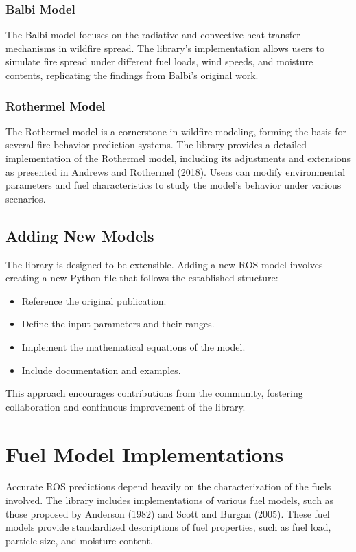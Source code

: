 \documentclass{article}
\begin{document}
	\subsubsection{Balbi Model}
	The Balbi model focuses on the radiative and convective heat transfer mechanisms in wildfire spread. The library's implementation allows users to simulate fire spread under different fuel loads, wind speeds, and moisture contents, replicating the findings from Balbi's original work.
	
	\subsubsection{Rothermel Model}
	The Rothermel model is a cornerstone in wildfire modeling, forming the basis for several fire behavior prediction systems. The library provides a detailed implementation of the Rothermel model, including its adjustments and extensions as presented in Andrews and Rothermel (2018). Users can modify environmental parameters and fuel characteristics to study the model's behavior under various scenarios.
	
	\subsection{Adding New Models}
	The library is designed to be extensible. Adding a new ROS model involves creating a new Python file that follows the established structure:
	
	\begin{itemize}
		\item Reference the original publication.
		\item Define the input parameters and their ranges.
		\item Implement the mathematical equations of the model.
		\item Include documentation and examples.
	\end{itemize}
	
	This approach encourages contributions from the community, fostering collaboration and continuous improvement of the library.
	
	\section{Fuel Model Implementations}
	Accurate ROS predictions depend heavily on the characterization of the fuels involved. The library includes implementations of various fuel models, such as those proposed by Anderson (1982) and Scott and Burgan (2005). These fuel models provide standardized descriptions of fuel properties, such as fuel load, particle size, and moisture content.
	
\end{document}
